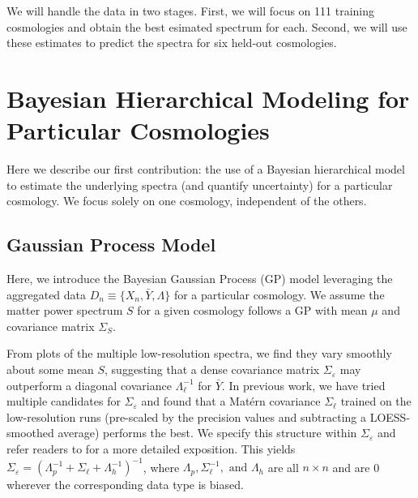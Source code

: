 \documentclass[11pt]{article}
\begin{document}
We will handle the data in two stages.  First, we will focus on 111 training cosmologies and obtain the best esimated spectrum for each.  Second, we will use these estimates to predict the spectra for six held-out cosmologies.

\section{Bayesian Hierarchical Modeling for Particular Cosmologies}
\label{sec:hm_fit}

Here we describe our first contribution: the use of a Bayesian hierarchical model to estimate the underlying spectra (and quantify uncertainty) for a particular cosmology.  We focus solely on one cosmology, independent of the others.

\subsection{Gaussian Process Model}

Here, we introduce the Bayesian Gaussian Process (GP) model leveraging the aggregated data $D_n \equiv \{X_n, \bar Y, \Lambda\}$ for a particular cosmology. We assume the matter power spectrum $S$ for a given cosmology follows a GP with mean $\mu$ and covariance matrix $\Sigma_S$.

From plots of the multiple low-resolution spectra, we find they vary smoothly about some mean $S$, suggesting that a dense covariance matrix $\Sigma_\varepsilon$ may outperform a diagonal covariance $\Lambda_\ell^{-1}$ for $\bar Y$. In previous work, we have tried multiple candidates for $\Sigma_\varepsilon$ \citep{walsh2023bayesian} and found that a Mat\'ern covariance $\Sigma_\ell$ trained on the low-resolution runs (pre-scaled by the precision values and subtracting a LOESS-smoothed average) performs the best. We specify this structure within $\Sigma_\varepsilon$ and refer readers to \cite{walsh2023bayesian} for a more detailed exposition. This yields $\Sigma_\varepsilon=\left(\Lambda_p^{-1} + \Sigma_\ell + \Lambda_h^{-1}\right)^{-1}$, where $\Lambda_p, \Sigma_\ell^{-1}, \text{ and } \Lambda_h$ are all $n\times n$ and are 0 wherever the corresponding data type is biased.

\end{document}
